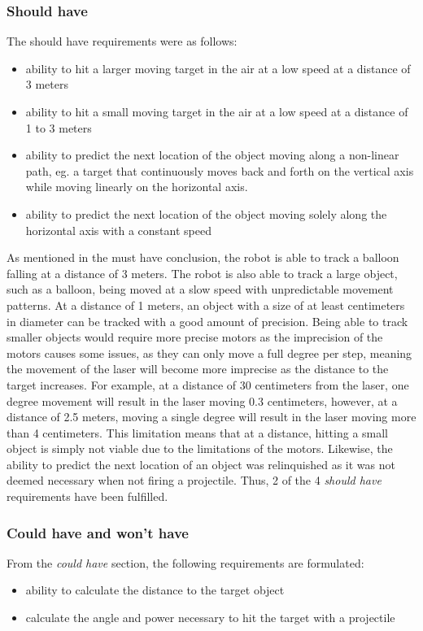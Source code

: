 \subsubsection{Should have}
The should have requirements were as follows:
\begin{itemize}
	\item ability to hit a larger moving target in the air at a low speed at a distance of 3 meters
	\item ability to hit a small moving target in the air at a low speed at a distance of 1 to 3 meters
	\item ability to predict the next location of the object moving along a non-linear path, eg{.} a target that continuously moves back and forth on the vertical axis while moving linearly on the horizontal axis.
	\item ability to predict the next location of the object moving solely along the horizontal axis with a constant speed
\end{itemize}

As mentioned in the must have conclusion, the robot is able to track a balloon falling at a distance of 3 meters.
The robot is also able to track a large object, such as a balloon, being moved at a slow speed with unpredictable movement patterns.
At a distance of 1 meters, an object with a size of at least  centimeters in diameter can be tracked with a good amount of precision.
Being able to track smaller objects would require more precise motors as the imprecision of the motors causes some issues, as they can only move a full degree per step, meaning the movement of the laser will become more imprecise as the distance to the target increases.
For example, at a distance of 30 centimeters from the laser, one degree movement will result in the laser moving 0.3 centimeters, however, at a distance of 2.5 meters, moving a single degree will result in the laser moving more than 4 centimeters.
This limitation means that at a distance, hitting a small object is simply not viable due to the limitations of the motors.
Likewise, the ability to predict the next location of an object was relinquished as it was not deemed necessary when not firing a projectile.
Thus, 2 of the 4 \textit{should have} requirements have been fulfilled.

\subsubsection{Could have and won't have}
From the \textit{could have} section, the following requirements are formulated:
\begin{itemize}
	\item ability to calculate the distance to the target object
	\item calculate the angle and power necessary to hit the target with a projectile
\end{itemize}

